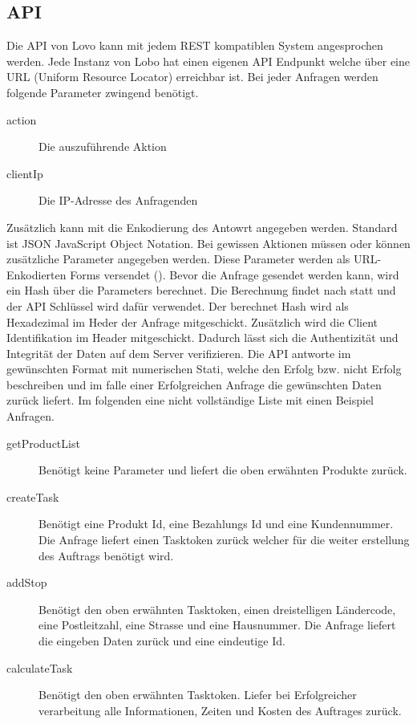 \subsection{API}

Die API von Lovo kann mit jedem REST kompatiblen System angesprochen werden. Jede Instanz von Lobo hat einen eigenen API Endpunkt welche über eine URL (Uniform Resource Locator) erreichbar ist. Bei jeder Anfragen werden folgende Parameter zwingend benötigt.
\begin{description}
	\item[action] Die auszuführende Aktion
	\item[clientIp] Die IP-Adresse des Anfragenden
\end{description}
Zusätzlich kann mit  die Enkodierung des Antowrt angegeben werden. Standard ist JSON {JavaScript Object Notation}. Bei gewissen Aktionen   müssen oder können zusätzliche Parameter angegeben werden. Diese Parameter werden als URL-Enkodierten Forms versendet ().
Bevor die Anfrage gesendet werden kann, wird ein Hash über die Parameters berechnet. Die Berechnung findet nach  statt und der API Schlüssel wird dafür verwendet. Der berechnet Hash wird als Hexadezimal im Heder der Anfrage mitgeschickt. Zusätzlich wird die Client Identifikation im Header mitgeschickt. Dadurch lässt sich die Authentizität und Integrität der Daten auf dem Server verifizieren. Die API antworte im gewünschten Format mit numerischen Stati, welche den Erfolg bzw. nicht Erfolg beschreiben und im falle einer Erfolgreichen Anfrage die gewünschten Daten zurück liefert. Im folgenden eine nicht vollständige Liste mit einen Beispiel Anfragen.

\begin{description}
	\item[getProductList] Benötigt keine Parameter und liefert die oben erwähnten Produkte zurück.
	\item[createTask] Benötigt eine Produkt Id, eine Bezahlungs Id und eine Kundennummer. Die Anfrage liefert einen Tasktoken zurück welcher für die weiter erstellung des Auftrags benötigt wird.
	\item[addStop] Benötigt den oben erwähnten Tasktoken, einen dreistelligen Ländercode, eine Postleitzahl, eine Strasse und eine Hausnummer. Die Anfrage liefert die eingeben Daten zurück und eine eindeutige Id.
	\item[calculateTask] Benötigt den oben erwähnten Tasktoken. Liefer bei Erfolgreicher verarbeitung alle Informationen, Zeiten und Kosten des Auftrages zurück.
\end{description}
